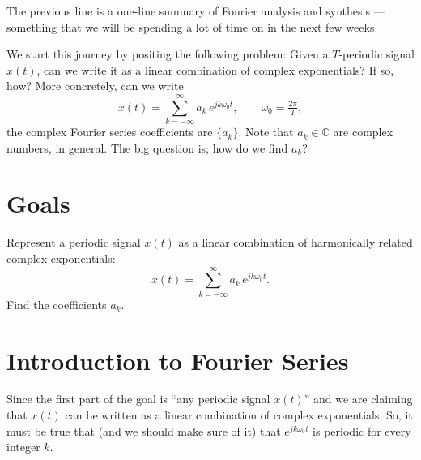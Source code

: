 The previous line is a one-line summary of Fourier analysis and synthesis --- something that we will be spending a lot of time on in the next few weeks.

We start this journey by positing the following problem:  Given a $T$-periodic signal $x(t)$, can we write it as a linear combination of complex exponentials? If so, how? More concretely, can we write
\[
x(t)=\sum_{k=-\infty}^{\infty} a_k\,e^{jk\omega_0 t},
\qquad \omega_0=\tfrac{2\pi}{T},
\]
the complex Fourier series coefficients are $\{a_k\}$. Note that $a_k \in \mathbb{C}$ are complex numbers, in general. The big question is; how do we find $a_k$?

\section{Goals}
Represent a periodic signal $x(t)$ as a linear combination of harmonically related complex exponentials:
\begin{equation}
x(t)=\sum_{k=-\infty}^{\infty} a_k\,e^{jk\omega_0 t}.
\label{eq:fourier-series}
\end{equation}
Find the coefficients $a_k$.
\section{Introduction to Fourier Series}
Since the first part of the goal is ``any periodic signal $x(t)$'' and we are claiming that $x(t)$ can be written as a linear combination of complex exponentials. So, it must be true that (and we should make sure of it) that $e^{jk\omega_0 t}$ is periodic for every integer $k$.


